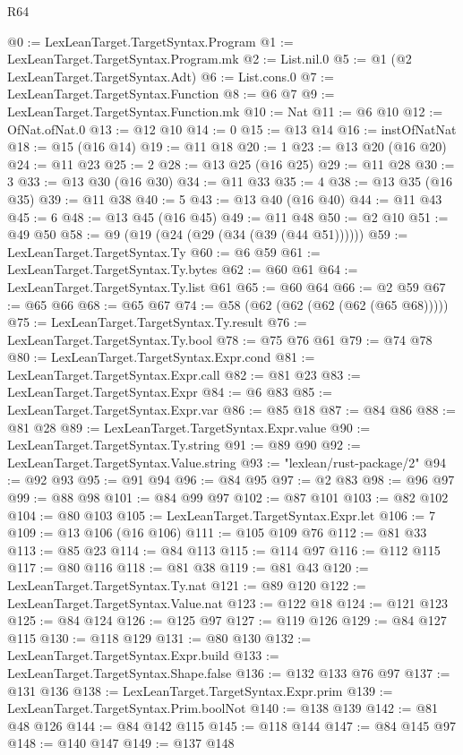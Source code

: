 \begin{lexlean}{R64}
\begin{coremodule}
@0 := LexLeanTarget.TargetSyntax.Program
@1 := LexLeanTarget.TargetSyntax.Program.mk
@2 := List.nil.{0}
@5 := @1 (@2 LexLeanTarget.TargetSyntax.Adt)
@6 := List.cons.{0}
@7 := LexLeanTarget.TargetSyntax.Function
@8 := @6 @7
@9 := LexLeanTarget.TargetSyntax.Function.mk
@10 := Nat
@11 := @6 @10
@12 := OfNat.ofNat.{0}
@13 := @12 @10
@14 := 0
@15 := @13 @14
@16 := instOfNatNat
@18 := @15 (@16 @14)
@19 := @11 @18
@20 := 1
@23 := @13 @20 (@16 @20)
@24 := @11 @23
@25 := 2
@28 := @13 @25 (@16 @25)
@29 := @11 @28
@30 := 3
@33 := @13 @30 (@16 @30)
@34 := @11 @33
@35 := 4
@38 := @13 @35 (@16 @35)
@39 := @11 @38
@40 := 5
@43 := @13 @40 (@16 @40)
@44 := @11 @43
@45 := 6
@48 := @13 @45 (@16 @45)
@49 := @11 @48
@50 := @2 @10
@51 := @49 @50
@58 := @9 (@19 (@24 (@29 (@34 (@39 (@44 @51))))))
@59 := LexLeanTarget.TargetSyntax.Ty
@60 := @6 @59
@61 := LexLeanTarget.TargetSyntax.Ty.bytes
@62 := @60 @61
@64 := LexLeanTarget.TargetSyntax.Ty.list @61
@65 := @60 @64
@66 := @2 @59
@67 := @65 @66
@68 := @65 @67
@74 := @58 (@62 (@62 (@62 (@62 (@65 @68)))))
@75 := LexLeanTarget.TargetSyntax.Ty.result
@76 := LexLeanTarget.TargetSyntax.Ty.bool
@78 := @75 @76 @61
@79 := @74 @78
@80 := LexLeanTarget.TargetSyntax.Expr.cond
@81 := LexLeanTarget.TargetSyntax.Expr.call
@82 := @81 @23
@83 := LexLeanTarget.TargetSyntax.Expr
@84 := @6 @83
@85 := LexLeanTarget.TargetSyntax.Expr.var
@86 := @85 @18
@87 := @84 @86
@88 := @81 @28
@89 := LexLeanTarget.TargetSyntax.Expr.value
@90 := LexLeanTarget.TargetSyntax.Ty.string
@91 := @89 @90
@92 := LexLeanTarget.TargetSyntax.Value.string
@93 := "lexlean/rust-package/2"
@94 := @92 @93
@95 := @91 @94
@96 := @84 @95
@97 := @2 @83
@98 := @96 @97
@99 := @88 @98
@101 := @84 @99 @97
@102 := @87 @101
@103 := @82 @102
@104 := @80 @103
@105 := LexLeanTarget.TargetSyntax.Expr.let
@106 := 7
@109 := @13 @106 (@16 @106)
@111 := @105 @109 @76
@112 := @81 @33
@113 := @85 @23
@114 := @84 @113
@115 := @114 @97
@116 := @112 @115
@117 := @80 @116
@118 := @81 @38
@119 := @81 @43
@120 := LexLeanTarget.TargetSyntax.Ty.nat
@121 := @89 @120
@122 := LexLeanTarget.TargetSyntax.Value.nat
@123 := @122 @18
@124 := @121 @123
@125 := @84 @124
@126 := @125 @97
@127 := @119 @126
@129 := @84 @127 @115
@130 := @118 @129
@131 := @80 @130
@132 := LexLeanTarget.TargetSyntax.Expr.build
@133 := LexLeanTarget.TargetSyntax.Shape.false
@136 := @132 @133 @76 @97
@137 := @131 @136
@138 := LexLeanTarget.TargetSyntax.Expr.prim
@139 := LexLeanTarget.TargetSyntax.Prim.boolNot
@140 := @138 @139
@142 := @81 @48 @126
@144 := @84 @142 @115
@145 := @118 @144
@147 := @84 @145 @97
@148 := @140 @147
@149 := @137 @148

\end{coremodule}
\end{lexlean}
